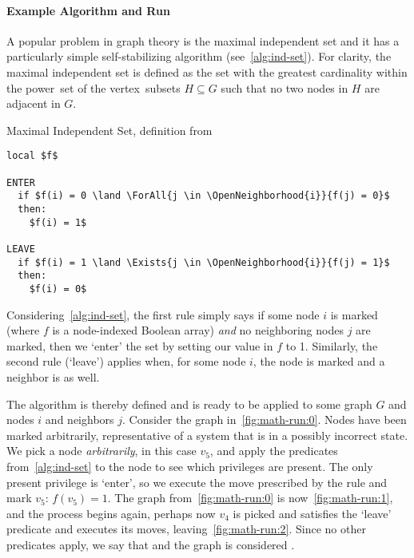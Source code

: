 \paragraph{Example Algorithm and Run}
A popular problem in graph theory is  \Dash
  the maximal independent set \Dash
  and it has a particularly simple self-stabilizing algorithm (see~\autoref{alg:ind-set}).
For clarity, the maximal independent set is defined as the set with the greatest cardinality
  within the power~set of the vertex~subsets $H \subseteq G$ such that
  no two nodes in $H$ are adjacent in $G$.

\begin{algorithm}[float]
  \caption{Maximal Independent Set, definition from \autocite{goddard:ssa--k-distance}}
  \label{alg:ind-set}
\begin{lstlisting}[language=ssa]
local $f$

ENTER
  if $f(i) = 0 \land \ForAll{j \in \OpenNeighborhood{i}}{f(j) = 0}$
  then:
    $f(i) = 1$

LEAVE
  if $f(i) = 1 \land \Exists{j \in \OpenNeighborhood{i}}{f(j) = 1}$
  then:
    $f(i) = 0$
\end{lstlisting}
\end{algorithm}

Considering~\autoref{alg:ind-set},
  the first rule simply says if some node $i$ is marked
  (where $f$ is a node-indexed Boolean array)
  \emph{and} no neighboring nodes $j$ are marked,
  then we \enquote*{enter} the set by setting our value in $f$ to 1.
Similarly, the second rule (\enquote*{leave})
  applies when, for some node $i$, the node is marked and a neighbor is as well.

The algorithm is thereby defined and is ready to be applied to
  some graph $G$ and nodes $i$ and neighbors $j$.
Consider the graph in~\autoref{fig:math-run:0}.
Nodes have been marked arbitrarily,
  representative of a system that is in a possibly incorrect state.
We pick a node \emph{arbitrarily}, in this case $v_5$,
  and apply the predicates from~\autoref{alg:ind-set} to the node
  to see which privileges are present.
The only present privilege is \enquote*{enter},
  so we execute the move prescribed by the rule and mark $v_5$: $f(v_5)=1$.
The graph from~\autoref{fig:math-run:0} is now~\autoref{fig:math-run:1},
  and the process begins again, perhaps now $v_4$ is picked and
  satisfies the \enquote*{leave} predicate and executes its moves,
  leaving~\autoref{fig:math-run:2}.
Since no other predicates apply, we say that 
  and the graph is considered .

